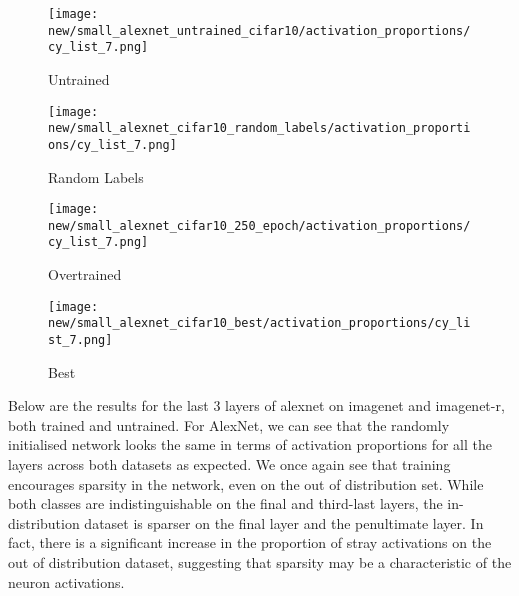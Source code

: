 \documentclass{article}
\begin{document}
            \begin{figure}[H]
                \centering
                \begin{minipage}{0.45\textwidth}
                    \centering
                    \texttt{[image: new/small\_alexnet\_untrained\_cifar10/activation\_proportions/cy\_list\_7.png]}
                    \caption{Untrained}
                \end{minipage}
                \hfill
                \begin{minipage}{0.45\textwidth}
                    \centering
                    \texttt{[image: new/small\_alexnet\_cifar10\_random\_labels/activation\_proportions/cy\_list\_7.png]}
                    \caption{Random Labels}
                \end{minipage}
                \begin{minipage}{0.45\textwidth}
                    \centering
                    \texttt{[image: new/small\_alexnet\_cifar10\_250\_epoch/activation\_proportions/cy\_list\_7.png]}
                    \caption{Overtrained}
                \end{minipage}
                \hfill
                \begin{minipage}{0.45\textwidth}
                    \centering
                    \texttt{[image: new/small\_alexnet\_cifar10\_best/activation\_proportions/cy\_list\_7.png]}
                    \caption{Best}
                \end{minipage}
                \hfill
                
                \label{fig:class_frog}
            \end{figure}
            Below are the results for the last 3 layers of alexnet on imagenet and imagenet-r, both trained and untrained. For AlexNet, we can see that the randomly initialised network looks the same in terms of activation proportions for all the layers across both datasets as expected. We once again see that training encourages sparsity in the network, even on the out of distribution set. While both classes are indistinguishable on the final and third-last layers, the in-distribution dataset is sparser on the final layer and the penultimate layer. In fact, there is a significant increase in the proportion of stray activations on the out of distribution dataset, suggesting that sparsity may be a characteristic of the neuron activations. 
\end{document}
